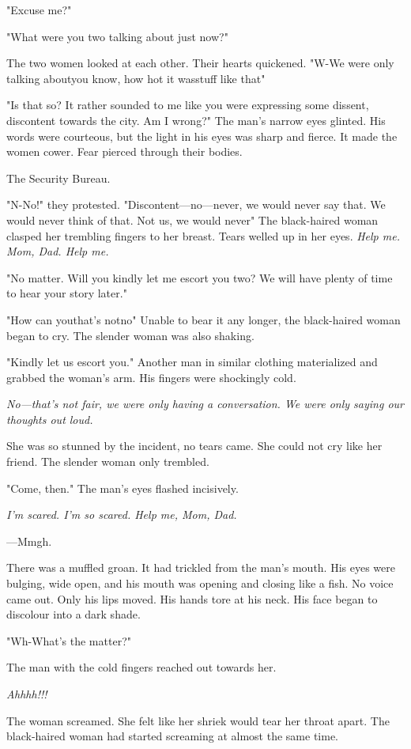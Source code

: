 "Excuse me?"

"What were you two talking about just now?"

The two women looked at each other. Their hearts quickened. "W-We were
only talking about\el you know, how hot it was\el stuff like that\el "

"Is that so? It rather sounded to me like you were expressing some
dissent, discontent towards the city. Am I wrong?" The man's narrow eyes
glinted. His words were courteous, but the light in his eyes was sharp
and fierce. It made the women cower. Fear pierced through their bodies.

The Security Bureau.

"N-No!" they protested. "Discontent---no---never, we would never say that.
We would never think of that. Not us, we would never\el " The
black-haired woman clasped her trembling fingers to her breast. Tears
welled up in her eyes. \emph{Help me. Mom, Dad. Help me.}

"No matter. Will you kindly let me escort you two? We will have plenty
of time to hear your story later."

"How can you\el that's not\el no\el " Unable to bear it any longer, the
black-haired woman began to cry. The slender woman was also shaking.

"Kindly let us escort you." Another man in similar clothing materialized
and grabbed the woman's arm. His fingers were shockingly cold.

\emph{No---that's not fair, we were only having a conversation. We were only
saying our thoughts out loud.}

She was so stunned by the incident, no tears came. She could not cry
like her friend. The slender woman only trembled.

"Come, then." The man's eyes flashed incisively.

\emph{I'm scared. I'm so scared. Help me, Mom, Dad.}

---Mmgh.

There was a muffled groan. It had trickled from the man's mouth. His
eyes were bulging, wide open, and his mouth was opening and closing like
a fish. No voice came out. Only his lips moved. His hands tore at his
neck. His face began to discolour into a dark shade.

"Wh-What's the matter?"

The man with the cold fingers reached out towards her.

\emph{Ahhhh!!!}

The woman screamed. She felt like her shriek would tear her throat
apart. The black-haired woman had started screaming at almost the same
time.

